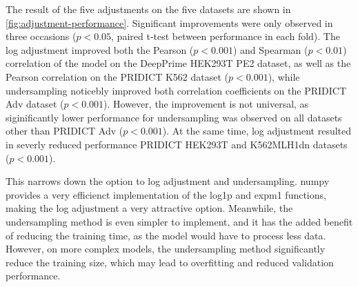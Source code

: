 The result of the five adjustments on the five datasets are shown in \autoref{fig:adjustment-performance}. Significant improvements were only observed in three occasions ($p<0.05$, paired t-test between performance in each fold). The log adjustment improved both the Pearson ($p<0.001$) and Spearman ($p<0.01$) correlation of the model on the DeepPrime HEK293T PE2 dataset, as well as the Pearson correlation on the PRIDICT K562 dataset ($p<0.001$), while undersampling noticebly improved both correlation coefficients on the PRIDICT Adv dataset ($p<0.001$). However, the improvement is not universal, as siginificantly lower performance for undersampling was observed on all datasets other than PRIDICT Adv ($p<0.001$). At the same time, log adjustment resulted in severly reduced performance PRIDICT HEK293T and K562MLH1dn datasets ($p<0.001$). 

This narrows down the option to log adjustment and undersampling. numpy provides a very efficienct implementation of the log1p and expm1 functions, making the log adjustment a very attractive option. Meanwhile, the undersampling method is even simpler to implement, and it has the added benefit of reducing the training time, as the model would have to process less data. However, on more complex models, the undersampling method significantly reduce the training size, which may lead to overfitting and reduced validation performance.

